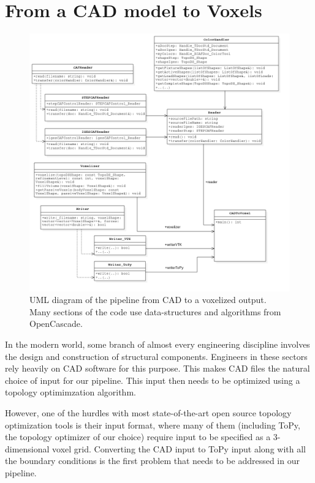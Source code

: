 \section{From a \acs{CAD} model to Voxels}
\label{sec: CADToVoxels}

\begin{figure}
  \includegraphics[scale=0.5]{Pictures/CADToVoxel/UML_Complete_PNG.png}
\caption{UML diagram of the pipeline from CAD to a voxelized output. Many sections of the code use data-structures and algorithms from OpenCascade\cite{OpenCascade}.}
\label{fig: umlCADToVoxel}
\end{figure}

In the modern world, some branch of almost every engineering discipline involves the design and construction of structural components. Engineers in these sectors rely heavily on CAD software for this purpose. This makes CAD files the natural choice of input for our pipeline. This input then needs to be optimized using a topology optimimzation algorithm.

However, one of the hurdles with most state-of-the-art open source topology optimization tools is their input format, where many of them (including ToPy, the topology optimizer of our choice) require input to be specified as a 3-dimensional voxel grid. Converting the CAD input to ToPy input along with all the boundary conditions is the first problem that needs to be addressed in our pipeline.

